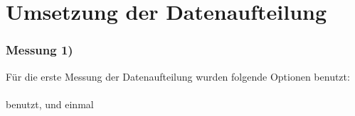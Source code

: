\documentclass[11pt]{article}
\begin{document}
\section{Umsetzung der Datenaufteilung}
\subsubsection*{Messung 1)}
Für die erste Messung der Datenaufteilung wurden folgende Optionen benutzt:\\
 \\
benutzt, und einmal \\
 \\
\end{document}
